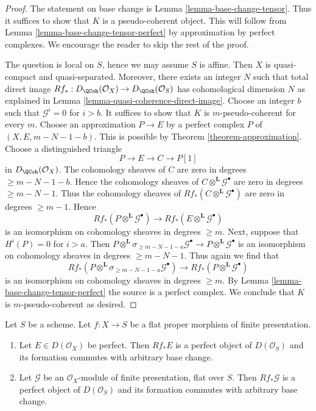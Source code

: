 \begin{proof}
The statement on base change is Lemma \ref{lemma-base-change-tensor}.
Thus it suffices to show that $K$ is a pseudo-coherent object.
This will follow from Lemma \ref{lemma-base-change-tensor-perfect}
by approximation by perfect complexes. We encourage the reader to
skip the rest of the proof.

\medskip\noindent
The question is local on $S$, hence we may assume $S$ is affine.
Then $X$ is quasi-compact and quasi-separated. Moreover, there
exists an integer $N$ such that total direct image
$Rf_* : D_\QCoh(\mathcal{O}_X) \to D_\QCoh(\mathcal{O}_S)$
has cohomological dimension $N$ as explained in
Lemma \ref{lemma-quasi-coherence-direct-image}.
Choose an integer $b$ such that $\mathcal{G}^i = 0$ for $i > b$.
It suffices to show that $K$ is $m$-pseudo-coherent for
every $m$. Choose an approximation $P \to E$ by a perfect complex $P$
of $(X, E, m - N - 1 - b)$. This is possible by
Theorem \ref{theorem-approximation}.
Choose a distinguished triangle
$$
P \to E \to C \to P[1]
$$
in $D_\QCoh(\mathcal{O}_X)$. The cohomology sheaves of $C$ are zero
in degrees $\geq m - N - 1 - b$. Hence the cohomology sheaves of
$C \otimes^\mathbf{L} \mathcal{G}^\bullet$ are zero in degrees
$\geq m - N - 1$. Thus the cohomology sheaves of
$Rf_*(C \otimes^\mathbf{L} \mathcal{G}^\bullet)$
are zero in degrees $\geq m - 1$.
Hence
$$
Rf_*(P \otimes^\mathbf{L} \mathcal{G}^\bullet) \to
Rf_*(E \otimes^\mathbf{L} \mathcal{G}^\bullet)
$$
is an isomorphism on cohomology sheaves in degrees $\geq m$.
Next, suppose that $H^i(P) = 0$ for $i > a$. Then
$
P \otimes^\mathbf{L} \sigma_{\geq m - N - 1 - a}\mathcal{G}^\bullet
\longrightarrow
P \otimes^\mathbf{L} \mathcal{G}^\bullet
$
is an isomorphism on cohomology sheaves in degrees $\geq m - N - 1$.
Thus again we find that
$$
Rf_*(P \otimes^\mathbf{L} \sigma_{\geq m - N - 1 - a}\mathcal{G}^\bullet) \to
Rf_*(P \otimes^\mathbf{L} \mathcal{G}^\bullet)
$$
is an isomorphism on cohomology sheaves in degrees $\geq m$.
By Lemma \ref{lemma-base-change-tensor-perfect} the source
is a perfect complex.
We conclude that $K$ is $m$-pseudo-coherent as desired.
\end{proof}

\begin{lemma}
\label{lemma-flat-proper-perfect-direct-image-general}
Let $S$ be a scheme. Let $f : X \to S$ be a flat proper
morphism of finite presentation.
\begin{enumerate}
\item Let $E \in D(\mathcal{O}_X)$ be perfect. Then
$Rf_*E$ is a perfect object of $D(\mathcal{O}_S)$ and its formation
commutes with arbitrary base change.
\item Let $\mathcal{G}$ be an $\mathcal{O}_X$-module of finite presentation,
flat over $S$. Then $Rf_*\mathcal{G}$ is a perfect object of
$D(\mathcal{O}_S)$ and its formation commutes with arbitrary base change.
\end{enumerate}
\end{lemma}

